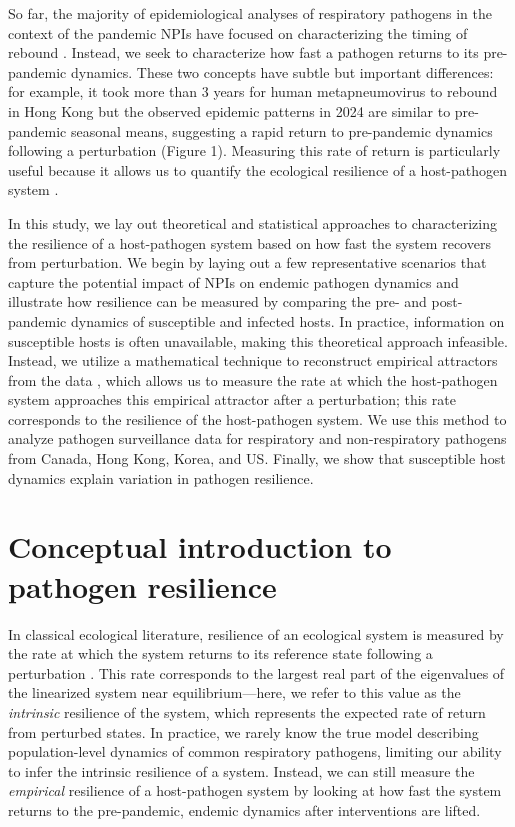 \documentclass[12pt]{article}
\newcommand{\comment}{\showcomment}
\newcommand{\showcomment}[3]{\textcolor{#1}{\textbf{[#2: }\textsl{#3}\textbf{]}}}
\newcommand{\swp}[1]{\comment{magenta}{SWP}{#1}}
\begin{document}
So far, the majority of epidemiological analyses of respiratory pathogens in the context of the pandemic NPIs have focused on characterizing the timing of rebound \citep{baker2020impact,eden2022off,perofsky2024impacts}.
Instead, we seek to characterize how fast a pathogen returns to its pre-pandemic dynamics.
These two concepts have subtle but important differences: 
for example, it took more than 3 years for human metapneumovirus to rebound in Hong Kong but the observed epidemic patterns in 2024 are similar to pre-pandemic seasonal means, suggesting a rapid return to pre-pandemic dynamics following a perturbation (Figure 1).
Measuring this rate of return is particularly useful because it allows us to quantify the ecological resilience of a host-pathogen system \citep{pimm1979structure, neubert1997alternatives,gunderson2000ecological,dakos2022ecological}.

In this study, we lay out theoretical and statistical approaches to characterizing the resilience of a host-pathogen system based on how fast the system recovers from perturbation.
We begin by laying out a few representative scenarios that capture the potential impact of NPIs on endemic pathogen dynamics and illustrate how resilience can be measured by comparing the pre- and post-pandemic dynamics of susceptible and infected hosts.
In practice, information on susceptible hosts is often unavailable, making this theoretical approach infeasible.
Instead, we utilize a mathematical technique to reconstruct empirical attractors from the data \citep{takens2006detecting}, which allows us to measure the rate at which the host-pathogen system approaches this empirical attractor after a perturbation;
this rate corresponds to the resilience of the host-pathogen system.
We use this method to analyze pathogen surveillance data for respiratory and non-respiratory pathogens from Canada, Hong Kong, Korea, and US.
Finally, we show that susceptible host dynamics explain variation in pathogen resilience.
 
\section*{Conceptual introduction to pathogen resilience}

In classical ecological literature, resilience of an ecological system is measured by the rate at which the system returns to its reference state following a perturbation \citep{pimm1979structure, neubert1997alternatives,gunderson2000ecological,dakos2022ecological}.
This rate corresponds to the largest real part of the eigenvalues of the linearized system near equilibrium---here, we refer to this value as the \emph{intrinsic} resilience of the system, which represents the expected rate of return from perturbed states.
In practice, we rarely know the true model describing population-level dynamics of common respiratory pathogens, limiting our ability to infer the intrinsic resilience of a system.
Instead, we can still measure the \emph{empirical} resilience of a host-pathogen system by looking at how fast the system returns to the pre-pandemic, endemic dynamics after interventions are lifted.
\end{document}
